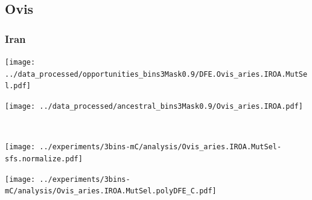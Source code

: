 \subsection{Ovis}

\subsubsection{Iran}

\begin{minipage}{0.49\linewidth}
    \texttt{[image: ../data\_processed/opportunities\_bins3Mask0.9/DFE.Ovis\_aries.IROA.MutSel.pdf]}
\end{minipage}
\begin{minipage}{0.49\linewidth}
    \texttt{[image: ../data\_processed/ancestral\_bins3Mask0.9/Ovis\_aries.IROA.pdf]}
\end{minipage}
\\
\begin{minipage}{0.49\linewidth}
    \texttt{[image: ../experiments/3bins-mC/analysis/Ovis\_aries.IROA.MutSel-sfs.normalize.pdf]}
\end{minipage}
\begin{minipage}{0.4\linewidth}
    \texttt{[image: ../experiments/3bins-mC/analysis/Ovis\_aries.IROA.MutSel.polyDFE\_C.pdf]}
\end{minipage}
